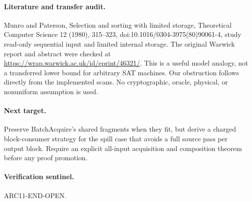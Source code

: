 \documentclass{article}
\begin{document}
\paragraph{Literature and transfer audit.}
Munro and Paterson, Selection and sorting with limited storage,
Theoretical Computer Science 12 (1980), 315--323,
doi:10.1016/0304-3975(80)90061-4, study read-only sequential input
and limited internal storage. The original Warwick report and abstract
were checked at \url{https://wrap.warwick.ac.uk/id/eprint/46321/}.
This is a useful model analogy, not a transferred lower bound for arbitrary
SAT machines. Our obstruction follows directly from the implemented scans.
No cryptographic, oracle, physical, or nonuniform assumption is used.

\paragraph{Next target.}
Preserve BatchAcquire's shared fragments when they fit, but derive a
charged block-consumer strategy for the spill case that avoids a full
source pass per output block. Require an explicit all-input acquisition
and composition theorem before any proof promotion.
\paragraph{Verification sentinel.} ARC11-END-OPEN.
\end{document}
